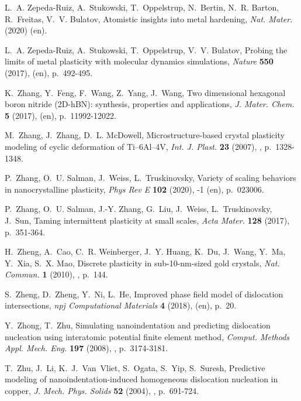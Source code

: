 \documentclass[CRPHYS,Unicode,manuscript]{cedram}
\begin{document}
\begin{thebibliography}{100}
L.~A. Zepeda-Ruiz, A.~Stukowski, T.~Oppelstrup, N.~Bertin, N.~R. Barton,
  R.~Freitas, V.~V. Bulatov, {\og Atomistic insights into metal hardening\fg},
  \emph{Nat. Mater.} (2020) (en).

L.~A. Zepeda-Ruiz, A.~Stukowski, T.~Oppelstrup, V.~V. Bulatov, {\og Probing the
  limits of metal plasticity with molecular dynamics simulations\fg},
  \emph{Nature} \textbf{550} (2017),  (en), p.~492-495.

K.~Zhang, Y.~Feng, F.~Wang, Z.~Yang, J.~Wang, {\og Two dimensional hexagonal
  boron nitride ({2D-hBN)}: synthesis, properties and applications\fg},
  \emph{J. Mater. Chem.} \textbf{5} (2017),  (en), p.~11992-12022.

M.~Zhang, J.~Zhang, D.~L. McDowell, {\og Microstructure-based crystal
  plasticity modeling of cyclic deformation of {Ti--6Al--4V}\fg}, \emph{Int. J.
  Plast.} \textbf{23} (2007), , p.~1328-1348.

P.~Zhang, O.~U. Salman, J.~Weiss, L.~Truskinovsky, {\og Variety of scaling
  behaviors in nanocrystalline plasticity\fg}, \emph{Phys Rev E} \textbf{102}
  (2020), -1 (en), p.~023006.

P.~Zhang, O.~U. Salman, J.-Y. Zhang, G.~Liu, J.~Weiss, L.~Truskinovsky, J.~Sun,
  {\og Taming intermittent plasticity at small scales\fg}, \emph{Acta Mater.}
  \textbf{128} (2017), p.~351-364.

H.~Zheng, A.~Cao, C.~R. Weinberger, J.~Y. Huang, K.~Du, J.~Wang, Y.~Ma, Y.~Xia,
  S.~X. Mao, {\og Discrete plasticity in sub-10-nm-sized gold crystals\fg},
  \emph{Nat. Commun.} \textbf{1} (2010), , p.~144.

S.~Zheng, D.~Zheng, Y.~Ni, L.~He, {\og Improved phase field model of
  dislocation intersections\fg}, \emph{npj Computational Materials} \textbf{4}
  (2018),  (en), p.~20.

Y.~Zhong, T.~Zhu, {\og Simulating nanoindentation and predicting dislocation
  nucleation using interatomic potential finite element method\fg},
  \emph{Comput. Methods Appl. Mech. Eng.} \textbf{197} (2008), ,
  p.~3174-3181.

T.~Zhu, J.~Li, K.~J.~Van~Vliet, S.~Ogata, S.~Yip, S.~Suresh, {\og Predictive
  modeling of nanoindentation-induced homogeneous dislocation nucleation in
  copper\fg}, \emph{J. Mech. Phys. Solids} \textbf{52} (2004), ,
  p.~691-724.


\end{thebibliography}
\end{document}
